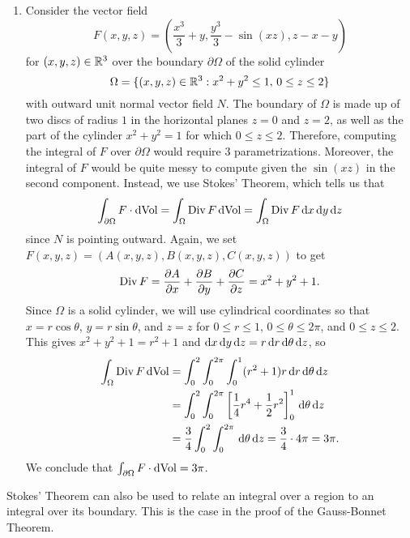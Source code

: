 \begin{enumerate}[(1)]
    \item Consider the vector field 
    \[ F(x, y, z) = \left( \frac{x^3}{3} + y, \frac{y^3}{3} - \sin(xz), z - x - y \right) \] 
    for $(x, y, z) \in \mathbb{R}^3$ over the boundary $\partial\Omega$ of the solid cylinder 
    \[ \Omega = \{(x, y, z) \in \mathbb{R}^3 : x^2 + y^2 \leq 1,\, 0 \leq z \leq 2\} \] 
    with outward unit normal vector field $N$. The boundary of $\Omega$ 
    is made up of two discs of radius $1$ in the horizontal planes $z = 0$ and 
    $z = 2$, as well as the part of the cylinder $x^2 + y^2 = 1$ for which 
    $0 \leq z \leq 2$. Therefore, computing the integral of $F$ over 
    $\partial\Omega$ would require $3$ parametrizations. Moreover, the integral 
    of $F$ would be quite messy to compute given the $\sin(xz)$ in the second 
    component. Instead, we use Stokes' Theorem, which tells us that 
    \[ \int_{\partial\Omega} F \cdot \operatorname{dVol} = \int_\Omega \operatorname{Div} F \operatorname{dVol}
    = \int_\Omega \operatorname{Div} F \,\mathrm{d} x \,\mathrm{d} y \,\mathrm{d} z \]
    since $N$ is pointing outward. Again, we set $F(x, y, z) = 
    (A(x, y, z), B(x, y, z), C(x, y, z))$ to get 
    \[ \operatorname{Div} F = \frac{\partial A}{\partial x} + \frac{\partial B}{\partial y} 
    + \frac{\partial C}{\partial z} = x^2 + y^2 + 1. \]
    Since $\Omega$ is a solid cylinder, we will use cylindrical coordinates 
    so that $x = r\cos\theta$, $y = r\sin\theta$, and $z = z$ for 
    $0 \leq r \leq 1$, $0 \leq \theta \leq 2\pi$, and $0 \leq z \leq 2$. 
    This gives $x^2 + y^2 + 1 = r^2 + 1$ and ${\rm d}x\,\mathrm{d} y \,\mathrm{d} z = 
    r\,\mathrm{d} r \,\mathrm{d}\theta \,\mathrm{d} z$, so 
    \begin{align*}
        \int_\Omega \operatorname{Div} F \operatorname{dVol} 
        &= \int_0^2 \int_0^{2\pi} \int_0^1 (r^2 + 1)r \,\mathrm{d} r \,\mathrm{d} \theta \,\mathrm{d} z \\ 
        &= \int_0^2 \int_0^{2\pi} \left[ \frac14r^4 + \frac12r^2 \right]_0^1 \,\mathrm{d}\theta \,\mathrm{d} z \\ 
        &= \frac34 \int_0^2 \int_0^{2\pi} \,\mathrm{d}\theta \,\mathrm{d} z = \frac34 \cdot 4\pi = 3\pi. 
    \end{align*}
    We conclude that $\int_{\partial\Omega} F \cdot \operatorname{dVol} = 3\pi$. 
\end{enumerate}

Stokes' Theorem can also be used to relate an integral over a region to 
an integral over its boundary. This is the case in the proof of the 
Gauss-Bonnet Theorem.